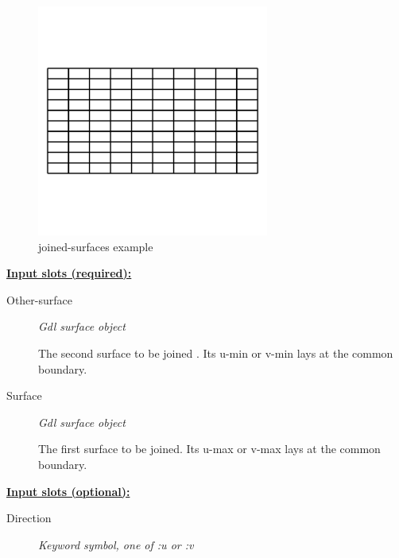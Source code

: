 \documentclass [11pt]{book}
\begin{document}
\begin{itemize}
\begin{figure}
\begin{center}
\includegraphics[width=3in,height=3in]{../images/example-joined-surfaces.pdf}
\end{center}

\caption{joined-surfaces example}

\label{fig:joined-surfaces}

\end{figure}





\textbf{
\underline{Input slots (required):}}

\begin{description}

\item [Other-surface]
\emph{Gdl surface object}

 The second surface to be joined . Its u-min or v-min lays at the common boundary.




\item [Surface]
\emph{Gdl surface object}

 The first surface to be joined. Its u-max or v-max lays at the common boundary.




\end{description}






\textbf{
\underline{Input slots (optional):}}

\begin{description}

\item [Direction]
\emph{Keyword symbol, one of :u or :v}


\end{description}
\end{itemize}
\end{document}
